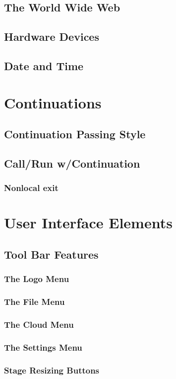 \documentclass{report}
\begin{document}
\section{The World Wide Web}
\section{Hardware Devices}
\section{Date and Time}
\chapter{Continuations}
\section{Continuation Passing Style}
\section{Call/Run w/Continuation}
\subsection{Nonlocal exit}
\chapter{User Interface Elements}
\section{Tool Bar Features}
\subsection{The \Snap{} Logo Menu}
\subsection{The File Menu}
\subsection{The Cloud Menu}
\subsection{The Settings Menu}
\subsection{Stage Resizing Buttons}
\end{document}
